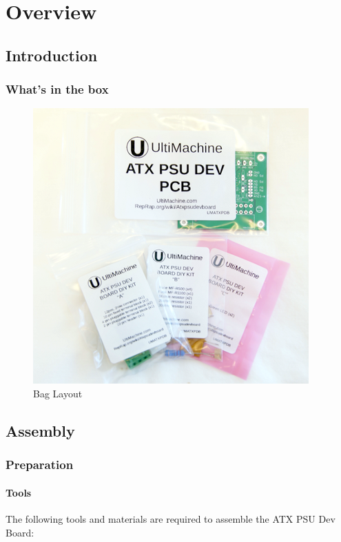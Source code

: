 \section{Overview}

\subsection{Introduction}

\subsubsection{What's in the box}

\begin{figure}[htbp]
\centering
\includegraphics{./png/kit.png}
\caption{Bag Layout}
\end{figure}

\subsection{Assembly}

\subsubsection{Preparation}

\paragraph{Tools}

The following tools and materials are required to assemble the ATX PSU
Dev Board:

